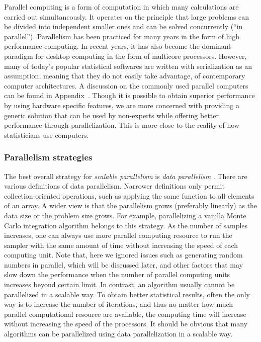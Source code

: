 Parallel computing is a form of computation in which many calculations are
carried out simultaneously. It operates on the principle that large problems
can be divided into independent smaller ones and can be solved concurrently
(``in parallel''). Parallelism has been practiced for many years in the form
of high performance computing. In recent years, it has also become the
dominant paradigm for desktop computing in the form of multicore processors.
However, many of today's popular statistical softwares are written with
serialization as an assumption, meaning that they do not easily take
advantage, of contemporary computer architectures. A discussion on the
commonly used parallel computers can be found in Appendix~. Though it is possible to obtain superior performance
by using hardware specific features, we are more concerned with providing a
generic solution that can be used by non-experts while offering better
performance through parallelization. This is more close to the reality of how
statisticians use computers.

\subsubsection{Parallelism strategies}
\label{ssub:Parallelism strategies}

The best overall strategy for \emph{scalable parallelism} is \emph{data
parallelism} \cite{datapar}. There are various definitions of data
parallelism. Narrower definitions only permit collection-oriented operations,
such as applying the same function to all elements of an array. A wider view
is that the parallelism grows (preferably linearly) as the data size or the
problem size grows. For example, parallelizing a vanilla Monte Carlo
integration algorithm belongs to this strategy. As the number of samples
increases, one can always use more parallel computing resource to run the
sampler with the same amount of time without increasing the speed of each
computing unit. Note that, here we ignored issues such as generating random
numbers in parallel, which will be discussed later, and other factors that
may slow down the performance when the number of parallel computing units
increases beyond certain limit. In contrast, an \mcmc algorithm usually
cannot be parallelized in a scalable way. To obtain better statistical
results, often the only way is to increase the number of iterations, and thus
no matter how much parallel computational resource are available, the
computing time will increase without increasing the speed of the processors.
It should be obvious that many \smc algorithms can be parallelized using data
parallelization in a scalable way.


